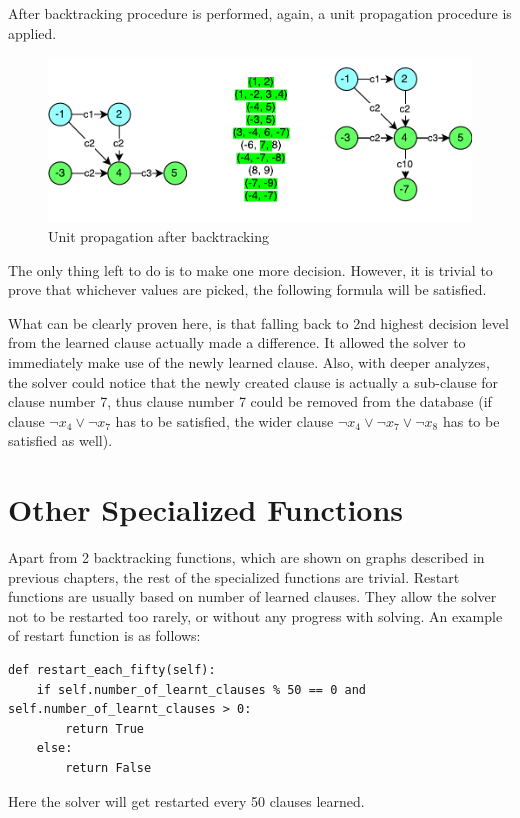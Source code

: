 \documentclass[12pt,english,pdflatex]{aghdpl}
\begin{document}
After  backtracking procedure is performed, again, a unit propagation procedure is applied.

\begin{figure}[H]
\begin{centering}
\includegraphics[scale=0.7]{img/CDCL_afterclauselearn}
\par\end{centering}
\caption{Unit propagation after backtracking}
\end{figure}

The only thing left to do is to make one more decision. However, it is trivial to prove
that whichever values are picked, the following formula will be satisfied. 

What can be clearly proven here, is that falling back to 2nd highest
decision level from the learned clause actually made a difference. It
allowed the solver to immediately make use of the newly learned clause. Also,
with deeper analyzes, the solver could notice that the newly created clause
is actually a sub-clause for clause number 7, thus clause number 7 could
be removed from the database (if clause $\neg x_4 \vee \neg x_7$ has to be satisfied, the wider
clause $\neg x_4 \vee \neg x_7\vee \neg x_8$ has to be satisfied as well).  

\section{Other Specialized Functions}
\label{sec:OtherFuncs}

Apart from 2 backtracking functions, which are shown on graphs
described in previous chapters, the rest of the specialized functions
are trivial. Restart functions are usually based on number of learned
clauses. They allow the  solver not to be restarted too rarely, or without
any progress with solving. An example of restart function is as follows:

\begin{lstlisting}
def restart_each_fifty(self):
    if self.number_of_learnt_clauses % 50 == 0 and self.number_of_learnt_clauses > 0:
        return True
    else:
        return False
\end{lstlisting}
Here the solver will get restarted every 50 clauses learned.
\end{document}
